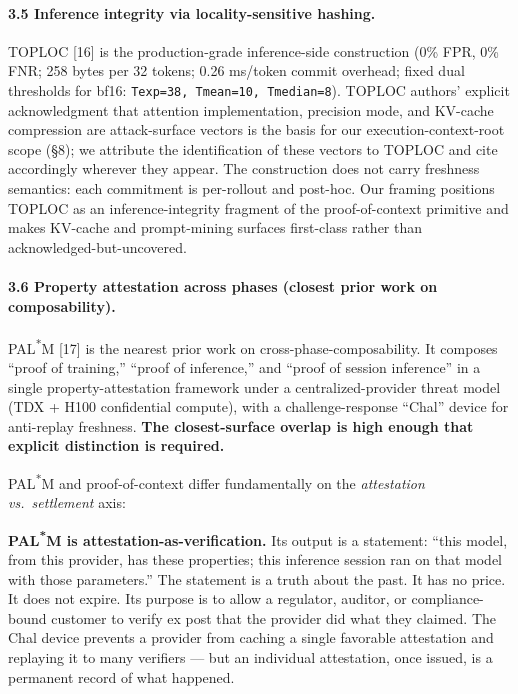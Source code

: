 \documentclass[11pt]{article}
\begin{document}
\paragraph{3.5 Inference integrity via locality-sensitive hashing.} TOPLOC [16] is the production-grade inference-side construction (0\% FPR, 0\% FNR; 258 bytes per 32 tokens; 0.26 ms/token commit overhead; fixed dual thresholds for bf16: \texttt{Texp=38, Tmean=10, Tmedian=8}). TOPLOC authors' explicit acknowledgment that attention implementation, precision mode, and KV-cache compression are attack-surface vectors is the basis for our execution-context-root scope (\S8); we attribute the identification of these vectors to TOPLOC and cite accordingly wherever they appear. The construction does not carry freshness semantics: each commitment is per-rollout and post-hoc. Our framing positions TOPLOC as an inference-integrity fragment of the proof-of-context primitive and makes KV-cache and prompt-mining surfaces first-class rather than acknowledged-but-uncovered.

\paragraph{3.6 Property attestation across phases (closest prior work on composability).} PAL\textsuperscript{*}M [17] is the nearest prior work on cross-phase-composability. It composes ``proof of training,'' ``proof of inference,'' and ``proof of session inference'' in a single property-attestation framework under a centralized-provider threat model (TDX + H100 confidential compute), with a challenge-response ``Chal'' device for anti-replay freshness. \textbf{The closest-surface overlap is high enough that explicit distinction is required.}

PAL\textsuperscript{*}M and proof-of-context differ fundamentally on the \emph{attestation vs.\ settlement} axis:

\textbf{PAL\textsuperscript{*}M is attestation-as-verification.} Its output is a statement: ``this model, from this provider, has these properties; this inference session ran on that model with those parameters.'' The statement is a truth about the past. It has no price. It does not expire. Its purpose is to allow a regulator, auditor, or compliance-bound customer to verify ex post that the provider did what they claimed. The Chal device prevents a provider from caching a single favorable attestation and replaying it to many verifiers --- but an individual attestation, once issued, is a permanent record of what happened.
\end{document}
